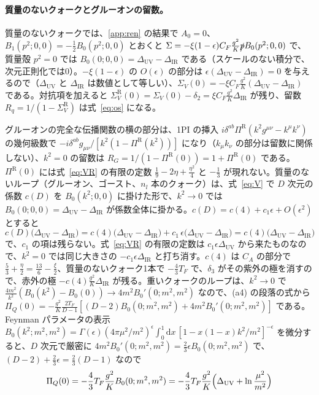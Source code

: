 \documentclass[a4paper,10pt]{ltjsarticle}
\newcommand{\dd}{\mathrm{d}}
\newcommand{\DUV}{\Delta_{\mathrm{UV}}}
\newcommand{\DIR}{\Delta_{\mathrm{IR}}}
\begin{document}
\paragraph{質量のないクォークとグルーオンの留数。}質量のないクォークでは、\ref{app:ren} の結果で $A_0=0$、$B_1(p^2;0,0)=-\frac12B_0(p^2;0,0)$ とおくと $\Sigma=-\xi(1-\epsilon)C_F\frac{g^2}K\slashed pB_0(p^2;0,0)$ で、質量殻 $p^2=0$ では $B_0(0;0,0)=\DUV-\DIR$ である（スケールのない積分で、次元正則化では0）。$-\xi(1-\epsilon)$ の $O(\epsilon)$ の部分は $\epsilon(\DUV-\DIR)=0$ を与えるので（$\DUV$ と $\DIR$ は数値として等しい）、$\Sigma_V(0)=-\xi C_F\frac{g^2}K(\DUV-\DIR)$ である。対抗項を加えると $\Sigma_V^{\mathrm R}(0)=\Sigma_V(0)-\delta_2=\xi C_F\frac{g^2}K\DIR$ が残り、留数 $R_q=1/(1-\Sigma_V^{\mathrm R})$ は式~\eqref{eq:os} になる。

グルーオンの完全な伝播関数の横の部分は、1PI の挿入 $i\delta^{ab}\Pi^{\mathrm R}(k^2g^{\mu\nu}-k^\mu k^\nu)$ の幾何級数で $-i\delta^{ab}g_{\mu\nu}/[k^2(1-\Pi^{\mathrm R}(k^2))]$ になり（$k_\mu k_\nu$ の部分は留数に関係しない）、$k^2=0$ の留数は $R_G=1/(1-\Pi^{\mathrm R}(0))=1+\Pi^{\mathrm R}(0)$ である。$\Pi^{\mathrm R}(0)$ には式~\eqref{eq:VR} の有限の定数 $\frac19-2\eta+\frac{\eta^2}4$ と $-\frac13$ が現れない。質量のないループ（グルーオン、ゴースト、$n_l$ 本のクォーク）は、式~\eqref{eq:V} で $D$ 次元の係数 $c(D)$ を $B_0(k^2;0,0)$ に掛けた形で、$k^2\to0$ では $B_0(0;0,0)=\DUV-\DIR$ が係数全体に掛かる。$c(D)=c(4)+c_1\epsilon+O(\epsilon^2)$ とすると
\begin{equation*}
c(D)\bigl(\DUV-\DIR\bigr)=c(4)\bigl(\DUV-\DIR\bigr)+c_1\,\epsilon\bigl(\DUV-\DIR\bigr)=c(4)\bigl(\DUV-\DIR\bigr)
\end{equation*}
で、$c_1$ の項は残らない。式~\eqref{eq:VR} の有限の定数は $c_1\epsilon\DUV$ から来たものなので、$k^2=0$ では同じ大きさの $-c_1\epsilon\DIR$ と打ち消す。$c(4)$ は $C_A$ の部分で $\frac53+\frac\eta2=\frac{13}6-\frac\xi2$、質量のないクォーク1本で $-\frac43T_F$ で、$\delta_3$ がその紫外の極を消すので、赤外の極 $-c(4)\frac{g^2}K\DIR$ が残る。重いクォークのループは、$k^2\to0$ で $\frac{4m^2}{k^2}(B_0(k^2)-B_0(0))\to4m^2B_0'(0;m^2,m^2)$ なので、(a4) の段落の式から $\Pi_Q(0)=-\frac{g^2}K\frac{2T_F}{D-1}[(D-2)B_0(0;m^2,m^2)+4m^2B_0'(0;m^2,m^2)]$ である。Feynman パラメータの表示 $B_0(k^2;m^2,m^2)=\Gamma(\epsilon)(4\pi\mu^2/m^2)^\epsilon\int_0^1\dd x\,[1-x(1-x)k^2/m^2]^{-\epsilon}$ を微分すると、$D$ 次元で厳密に $4m^2B_0'(0;m^2,m^2)=\frac23\epsilon B_0(0;m^2,m^2)$ で、$(D-2)+\frac23\epsilon=\frac23(D-1)$ なので
\begin{equation*}
\Pi_Q(0)=-\frac43T_F\frac{g^2}KB_0(0;m^2,m^2)=-\frac43T_F\frac{g^2}K\Bigl(\DUV+\ln\frac{\mu^2}{m^2}\Bigr)
\end{equation*}
\end{document}
